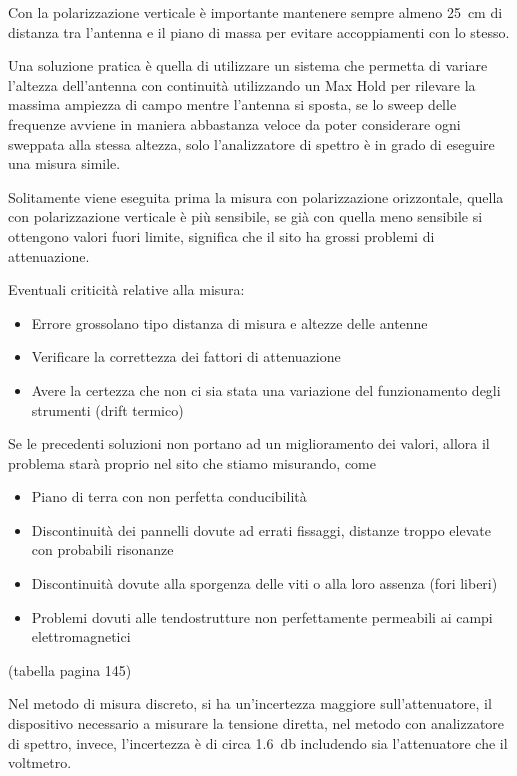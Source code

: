 Con la polarizzazione verticale è importante mantenere sempre almeno \SI{25}{\centi\meter} di
distanza tra l'antenna e il piano di massa per evitare accoppiamenti con lo stesso.

Una soluzione pratica è quella di utilizzare un sistema che permetta di variare l'altezza dell'antenna con continuità
utilizzando un Max Hold per rilevare la massima ampiezza di campo mentre l'antenna si sposta, se lo sweep delle
frequenze avviene in maniera abbastanza veloce da poter considerare ogni sweppata alla stessa altezza, 
solo l'analizzatore di spettro è in grado di eseguire una misura simile.

Solitamente viene eseguita prima la misura con polarizzazione orizzontale, quella con polarizzazione
verticale è più sensibile, se già con quella meno sensibile si ottengono valori fuori limite,
significa che il sito ha grossi problemi di attenuazione.
\newpage




Eventuali criticità relative alla misura:
\begin{itemize}
 \item Errore grossolano tipo distanza di misura e altezze delle antenne
 \item Verificare la correttezza dei fattori di attenuazione
 \item Avere la certezza che non ci sia stata una variazione del funzionamento degli strumenti (drift termico)
\end{itemize}
Se le precedenti soluzioni non portano ad un miglioramento dei valori, allora il problema
starà proprio nel sito che stiamo misurando, come
\begin{itemize}
 \item Piano di terra con non perfetta conducibilità
 \item Discontinuità dei pannelli dovute ad errati fissaggi, distanze troppo elevate con probabili risonanze
 \item Discontinuità dovute alla sporgenza delle viti o alla loro assenza (fori liberi)
 \item Problemi dovuti alle tendostrutture non perfettamente permeabili ai campi elettromagnetici
\end{itemize}
(tabella pagina 145)

Nel metodo di misura discreto, si ha un'incertezza maggiore sull'attenuatore, il dispositivo
necessario a misurare la tensione diretta, nel metodo con analizzatore di spettro, invece, l'incertezza è di
circa \SI{1,6}{\decibel} includendo sia l'attenuatore che il voltmetro.
